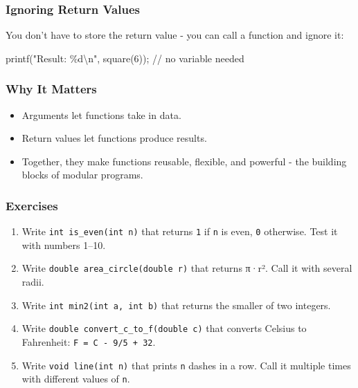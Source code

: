 \documentclass[
  letterpaper,
  DIV=11,
  numbers=noendperiod]{scrreprt}
\newenvironment{Shaded}{\begin{snugshade}}{\end{snugshade}}
\newcommand{\CommentTok}[1]{\textcolor[rgb]{0.37,0.37,0.37}{#1}}
\newcommand{\DecValTok}[1]{\textcolor[rgb]{0.68,0.00,0.00}{#1}}
\newcommand{\NormalTok}[1]{\textcolor[rgb]{0.00,0.23,0.31}{#1}}
\newcommand{\OperatorTok}[1]{\textcolor[rgb]{0.37,0.37,0.37}{#1}}
\newcommand{\SpecialCharTok}[1]{\textcolor[rgb]{0.37,0.37,0.37}{#1}}
\newcommand{\StringTok}[1]{\textcolor[rgb]{0.13,0.47,0.30}{#1}}
\providecommand{\tightlist}{%
  \setlength{\itemsep}{0pt}\setlength{\parskip}{0pt}}
\begin{document}
\subsubsection{Ignoring Return Values}\label{ignoring-return-values}

You don't have to store the return value - you can call a function and
ignore it:

\begin{Shaded}
\begin{Highlighting}[]
\NormalTok{printf}\OperatorTok{(}\StringTok{"Result: }\SpecialCharTok{\%d\textbackslash{}n}\StringTok{"}\OperatorTok{,}\NormalTok{ square}\OperatorTok{(}\DecValTok{6}\OperatorTok{));}  \CommentTok{// no variable needed}
\end{Highlighting}
\end{Shaded}

\subsubsection{Why It Matters}\label{why-it-matters-21}

\begin{itemize}
\tightlist
\item
  Arguments let functions take in data.
\item
  Return values let functions produce results.
\item
  Together, they make functions reusable, flexible, and powerful - the
  building blocks of modular programs.
\end{itemize}

\subsubsection{Exercises}\label{exercises-22}

\begin{enumerate}
\def\labelenumi{\arabic{enumi}.}
\tightlist
\item
  Write \texttt{int\ is\_even(int\ n)} that returns \texttt{1} if
  \texttt{n} is even, \texttt{0} otherwise. Test it with numbers 1--10.
\item
  Write \texttt{double\ area\_circle(double\ r)} that returns π·r². Call
  it with several radii.
\item
  Write \texttt{int\ min2(int\ a,\ int\ b)} that returns the smaller of
  two integers.
\item
  Write \texttt{double\ convert\_c\_to\_f(double\ c)} that converts
  Celsius to Fahrenheit: \texttt{F\ =\ C\ -\ 9/5\ +\ 32}.
\item
  Write \texttt{void\ line(int\ n)} that prints \texttt{n} dashes in a
  row. Call it multiple times with different values of \texttt{n}.
\end{enumerate}
\end{document}
